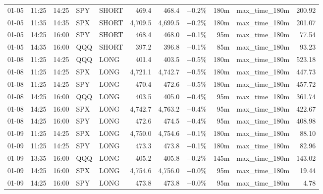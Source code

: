 \documentclass[11pt,a4paper,twoside]{article}
\begin{document}
\begin{center}
\begin{longtable}{>{\color{txtmain}}l l l l l r r r r >{\color{txtmain}}l r}
01-05 & 11:25 & 14:25 & SPY & SHORT & 469.4 & 468.4 & \textcolor{wingreen}{+0.2\%} & 180m & max\_time\_180m & \textcolor{wingreen}{200.92} \\
01-05 & 11:35 & 14:35 & SPX & SHORT & 4,709.5 & 4,699.5 & \textcolor{wingreen}{+0.2\%} & 180m & max\_time\_180m & \textcolor{wingreen}{201.07} \\
01-05 & 14:25 & 16:00 & SPY & SHORT & 468.4 & 468.0 & \textcolor{wingreen}{+0.1\%} & 95m & max\_time\_180m & \textcolor{wingreen}{77.54} \\
01-05 & 14:35 & 16:00 & QQQ & SHORT & 397.2 & 396.8 & \textcolor{wingreen}{+0.1\%} & 85m & max\_time\_180m & \textcolor{wingreen}{93.23} \\
01-08 & 11:25 & 14:25 & QQQ & LONG & 401.4 & 403.5 & \textcolor{wingreen}{+0.5\%} & 180m & max\_time\_180m & \textcolor{wingreen}{523.18} \\
01-08 & 11:25 & 14:25 & SPX & LONG & 4,721.1 & 4,742.7 & \textcolor{wingreen}{+0.5\%} & 180m & max\_time\_180m & \textcolor{wingreen}{447.73} \\
01-08 & 11:25 & 14:25 & SPY & LONG & 470.4 & 472.6 & \textcolor{wingreen}{+0.5\%} & 180m & max\_time\_180m & \textcolor{wingreen}{457.72} \\
01-08 & 14:25 & 16:00 & QQQ & LONG & 403.5 & 405.0 & \textcolor{wingreen}{+0.4\%} & 95m & max\_time\_180m & \textcolor{wingreen}{361.74} \\
01-08 & 14:25 & 16:00 & SPX & LONG & 4,742.7 & 4,763.2 & \textcolor{wingreen}{+0.4\%} & 95m & max\_time\_180m & \textcolor{wingreen}{422.67} \\
01-08 & 14:25 & 16:00 & SPY & LONG & 472.6 & 474.5 & \textcolor{wingreen}{+0.4\%} & 95m & max\_time\_180m & \textcolor{wingreen}{408.98} \\
01-09 & 11:25 & 14:25 & SPX & LONG & 4,750.0 & 4,754.6 & \textcolor{wingreen}{+0.1\%} & 180m & max\_time\_180m & \textcolor{wingreen}{88.10} \\
01-09 & 11:25 & 14:25 & SPY & LONG & 473.3 & 473.8 & \textcolor{wingreen}{+0.1\%} & 180m & max\_time\_180m & \textcolor{wingreen}{82.96} \\
01-09 & 13:35 & 16:00 & QQQ & LONG & 405.2 & 405.8 & \textcolor{wingreen}{+0.2\%} & 145m & max\_time\_180m & \textcolor{wingreen}{143.02} \\
01-09 & 14:25 & 16:00 & SPX & LONG & 4,754.6 & 4,756.0 & \textcolor{wingreen}{+0.0\%} & 95m & max\_time\_180m & \textcolor{wingreen}{19.44} \\
01-09 & 14:25 & 16:00 & SPY & LONG & 473.8 & 473.8 & \textcolor{wingreen}{+0.0\%} & 95m & max\_time\_180m & \textcolor{wingreen}{4.78} \\

\end{longtable}
\end{center}
\end{document}
